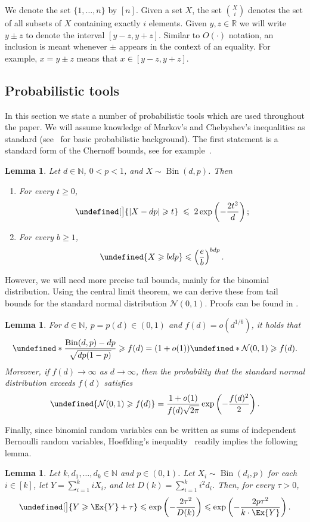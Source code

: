 \documentclass[reqno,a4paper,11pt]{amsart}
\newtheorem{lemma}[theorem]{Lemma}
\theoremstyle{definition}
\newcommand{\Bin}{\operatorname{Bin}}
\renewcommand{\le}{\leqslant}
\renewcommand{\leq}{\leqslant}
\renewcommand{\ge}{\geqslant}
\renewcommand{\geq}{\geqslant}
\let\Pr\undefined
\begin{document}
We denote the set $\{1, \ldots, n\}$ by $[n]$.
Given a set $X$, the set $\binom{X}{i}$ denotes the set of all subsets of $X$ containing exactly $i$ elements.
Given $y,z \in \mathbb{R}$ we will write $ y \pm z$ to denote the interval $[y-z,y+z]$.
Similar to $O(\cdot)$ notation, an inclusion is meant whenever $\pm$ appears in the context of an equality.
For example, $x = y \pm z$ means that $x \in [y-z, y+z]$.

\subsection{Probabilistic tools}

In this section we state a number of probabilistic tools which are used throughout the paper.
We will assume knowledge of Markov's and Chebyshev's inequalities as standard (see~\cite{Alon2016Book} for basic probabilistic background).
The first statement is a standard form of the Chernoff bounds, see for example~\cite[Appendix A]{Alon2016Book}.
\begin{lemma}\label{l:Chernoff}
  Let $d \in \mathbb{N}$, $0 < p < 1$, and $X \sim \Bin(d,p)$.
  Then
  \begin{enumerate}[$(a)$]
  \item For every $t \geq 0$,
    \[
      \Pr[\big]{|X - dp| \geq t} \; \le \; 2\exp\left( -\frac{2t^2}{d} \right);
    \]
  \item\label{i:bigtail} For every $b \geq 1$,
    \[
      \Pr{X \geq bdp} \leq \left(\frac{e}{b}\right)^{bdp}.
    \]
  \end{enumerate}
\end{lemma}
However, we will need more precise tail bounds, mainly for the binomial distribution.
Using the central limit theorem, we can derive these from tail bounds for the standard normal distribution $\mathcal{N}(0, 1)$.
Proofs can be found in \cite[Section 5.6]{Asymptopia}.

\begin{lemma}\label{l:CLT}
  For $d \in \mathbb{N}$, $p=p(d)\in (0,1)$ and $f(d) = o(d^{1/6})$, it holds that
  \[
    \Pr*{\frac{\Bin(d, p)-d p}{\sqrt{dp(1-p)}} \geq f(d)} = (1+o(1)) \Pr*{\mathcal{N}(0, 1) \geq f(d)}.
  \]
  Moreover, if $f(d) \to \infty$ as $d \to \infty$, then the probability that the standard normal distribution exceeds $f(d)$ satisfies
  \[
    \Pr{\mathcal{N}(0,1) \geq f(d)} = \frac{1+o(1)}{f(d) \sqrt{2 \pi}} \exp\left(-\frac{f(d)^2}{2}\right).
  \]
\end{lemma}

Finally, since binomial random variables can be written as sums of independent Bernoulli random variables, Hoeffding's inequality~\cite{Hoeffding1963} readily implies the following lemma.
\begin{lemma}\label{l:sumBin}
  Let $k,d_1,\ldots,d_k \in \mathbb{N}$ and $p \in (0,1)$.
  Let $X_i \sim \Bin(d_i,p)$ for each $i \in [k]$, let $Y = \sum_{i=1}^k iX_i$, and let $D(k) = \sum_{i=1}^k i^2 d_i$.
  Then, for every $\tau > 0$,
  \[
    \Pr[\big]{Y \ge \Ex{Y} + \tau} \le \exp\left( - \frac{2\tau^2}{D(k)} \right) \le \exp\left( - \frac{2p \tau^2}{k\cdot\Ex{Y}} \right).
  \]
\end{lemma}
\end{document}
